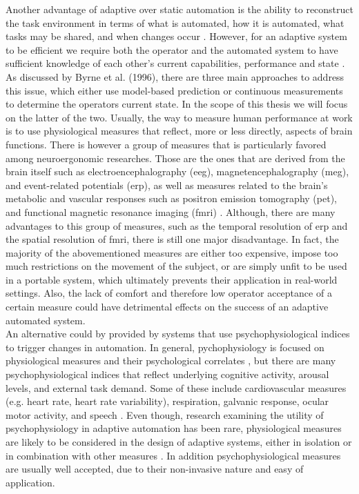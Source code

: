 Another advantage of adaptive over static automation is the ability to reconstruct the task environment in terms of what is automated, how it is automated, what tasks may be shared, and when changes occur \cite{Byrne1996}. 
However, for an adaptive system to be efficient we require both the operator and the automated system to have sufficient knowledge of each other's current capabilities, performance and state \cite{Byrne1996}.
As discussed by Byrne et al. (1996), there are three main approaches to address this issue, which either use model-based prediction or continuous measurements to determine the operators current state. In the scope of this thesis we will focus on the latter of the two. 
Usually, the way to measure human performance at work is to use physiological measures that reflect, more or less directly, aspects of brain functions. There is however a group of measures that is particularly favored among neuroergonomic researches. Those are the ones that are derived from the brain itself such as electroencephalography (\gls{eeg}), magnetencephalography (\gls{meg}), and event-related potentials (\gls{erp}), as well as measures related to the brain's metabolic and vascular responses such as positron emission tomography (\gls{pet}), and functional magnetic resonance imaging (\gls{fmri}) \cite{Parasuraman2003}. Although, there are many advantages to this group of measures, such as the temporal resolution of \gls{erp} and the spatial resolution of \gls{fmri}, there is still one major disadvantage. In fact, the majority of the abovementioned measures are either too expensive, impose too much restrictions on the movement of the subject, or are simply unfit to be used in a portable system, which ultimately prevents their application in real-world settings. Also, the lack of comfort and therefore low operator acceptance of a certain measure could have detrimental effects on the success of an adaptive automated system.\\
An alternative could by provided by systems that use psychophysiological indices to trigger changes in automation. In general, pychophysiology is focused on physiological measures and their psychological correlates \cite{Parasuraman2003}, but there are many psychophysiological indices that reflect underlying cognitive activity, arousal levels, and external task demand. Some of these include cardiovascular measures (e.g. heart rate, heart rate variability), respiration, galvanic response, ocular motor activity, and speech \cite{Parasuraman2008}. Even though, research examining the utility of psychophysiology in adaptive automation has been rare, physiological measures are likely to be considered in the design of adaptive systems, either in isolation or in combination with other measures \cite{Byrne1996}. In addition psychophysiological measures are usually well accepted, due to their non-invasive nature and easy of application.\\ 
